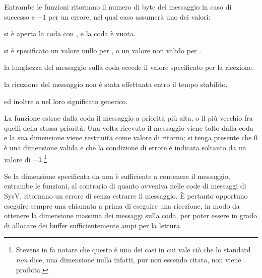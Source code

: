 \begin{funcproto}{
}
{Entrambe le funzioni ritornano il numero di byte del messaggio in caso di
  successo e $-1$ per un errore, nel qual caso  assumerà uno dei
  valori:
  \begin{errlist}
    \item[\errcode{EAGAIN}] si è aperta la coda con , e la
      coda è vuota.
    \item[\errcode{EINVAL}] si è specificato un valore nullo per
      , o un valore non valido per .
    \item[\errcode{EMSGSIZE}] la lunghezza del messaggio sulla coda eccede il
      valore  specificato per la ricezione.
    \item[\errcode{ETIMEDOUT}] la ricezione del messaggio non è stata
      effettuata entro il tempo stabilito.
  \end{errlist}
  ed inoltre  o  nel loro significato generico.  }
\end{funcproto}

La funzione estrae dalla coda  il messaggio a priorità più alta,
o il più vecchio fra quelli della stessa priorità. Una volta ricevuto il
messaggio viene tolto dalla coda e la sua dimensione viene restituita come
valore di ritorno; si tenga presente che 0 è una dimensione valida e che la
condizione di errore è indicata soltanto da un valore di
$-1$.\footnote{Stevens in \cite{UNP2} fa notare che questo è uno dei casi in
  cui vale ciò che lo standard \textsl{non} dice, una dimensione nulla
  infatti, pur non essendo citata, non viene proibita.}

Se la dimensione specificata da  non è sufficiente a contenere
il messaggio, entrambe le funzioni, al contrario di quanto avveniva nelle code
di messaggi di SysV, ritornano un errore di  senza estrarre
il messaggio.  È pertanto opportuno eseguire sempre una chiamata a
 prima di eseguire una ricezione, in modo da ottenere la
dimensione massima dei messaggi sulla coda, per poter essere in grado di
allocare dei buffer sufficientemente ampi per la lettura.

